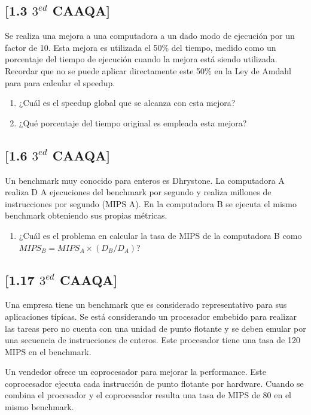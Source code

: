 \subsection{[1.3 $3^{ed}$ CAAQA]}
Se realiza una mejora a una computadora a un dado modo de ejecución por un factor de 10. Esta mejora es utilizada el 50\% del tiempo, medido como un porcentaje del tiempo de ejecución cuando la mejora está siendo utilizada. Recordar que no se puede aplicar directamente este 50\% en la Ley de Amdahl para para calcular el speedup.

\begin{enumerate}
 \item ¿Cuál es el speedup global que se alcanza con esta mejora?
 \item ¿Qué porcentaje del tiempo original es empleada esta mejora?
\end{enumerate}


\subsection{[1.6 $3^{ed}$ CAAQA]}
Un benchmark muy conocido para enteros es Dhrystone. La computadora A realiza D A ejecuciones del benchmark por segundo y realiza millones de instrucciones por segundo (MIPS A). En la computadora B se ejecuta el mismo benchmark obteniendo sus propias métricas.

\begin{enumerate}
 \item ¿Cuál es el problema en calcular la tasa de MIPS de la computadora B como $MIPS_B = MIPS_A \times (D_B / D_A )$?
\end{enumerate}



\subsection{[1.17 $3^{ed}$ CAAQA]}
Una empresa tiene un benchmark que es considerado representativo para sus aplicaciones típicas. Se está considerando un procesador embebido para realizar las tareas pero no cuenta con una unidad de punto flotante y se deben emular por una secuencia de instrucciones de enteros. Este procesador tiene una tasa de 120 MIPS en el benchmark.

Un vendedor ofrece un coprocesador para mejorar la performance. Este coprocesador ejecuta cada instrucción de punto flotante por hardware. Cuando se combina el procesador y el coprocesador resulta una tasa de MIPS de 80 en el mismo benchmark.


